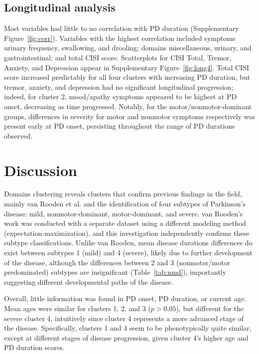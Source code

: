 \documentclass[preprint,5p]{elsarticle} %
\begin{document}
\subsection{Longitudinal analysis}

Most variables had little to no correlation with PD duration (Supplementary Figure~\ref{fig:corr}).
Variables with the highest correlation included symptoms urinary frequency, swallowing, and
drooling; domains miscellaneous, urinary, and gastrointestinal; and total CISI score. Scatterplots
for CISI Total, Tremor, Anxiety, and Depression appear in Supplementary Figure~\ref{fig:long4}.
Total CISI score increased predictably for all four clusters with increasing PD duration, but
tremor, anxiety, and depression had no significant longitudinal progression; indeed, for cluster
2, mood/apathy symptoms appeared to be highest at PD onset, decreasing as time progressed. Notably,
for the motor/nonmotor-dominant groups, differences in severity for motor and nonmotor symptoms
respectively was present early at PD onset, persisting throughout the range of PD durations
observed.

\section{Discussion}

Domains clustering reveals clusters that confirm previous
findings in the field, mainly van Rooden et al.\cite{vanrooden11} and the identification of four
subtypes of Parkinson's disease: mild, nonmotor-dominant, motor-dominant, and severe. van
Rooden's work was conducted with a separate dataset using a different modeling method
(expectation-maximization), and this investigation independently confirms these subtype
classifications. Unlike van Rooden, mean disease durations differences do exist between subtypes 1
(mild) and 4 (severe), likely due to further development of the disease, although the differences
between 2 and 3 (nonmotor/motor predominated) subtypes are insignificant
(Table~\ref{tab:nmd}), importantly suggesting different developmental paths of the disease.

Overall, little information was found in PD onset, PD duration, or current age. Mean ages were
similar for clusters 1, 2, and 3 ($p > 0.05$), but different for the severe cluster 4, intuitively
since cluster 4 represents a more advanced stage of the disease.  Specifically, clusters 1 and 4
seem to be phenotypically quite similar, except at different stages of disease progression, given
cluster 4's higher age and PD duration scores.
\end{document}

